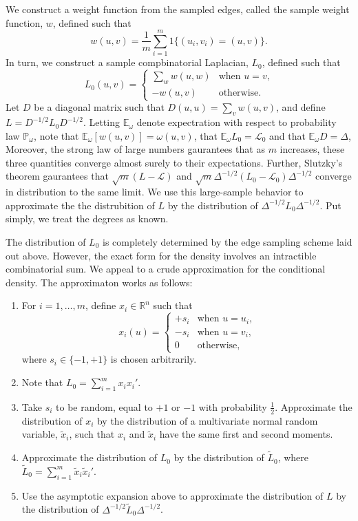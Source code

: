 \documentclass[12pt]{article}
\newcommand{\reals}{\mathbb{R}}
\newcommand{\prob}{\mathbb{P}}
\newcommand{\E}{\mathbb{E}}
\theoremstyle{plain}
\begin{document}
We construct a weight function from the sampled edges, called the
sample weight function, $w$, defined such that
\[
  w(u,v) = \frac{1}{m} \sum_{i=1}^{m} 1\{ (u_i, v_i) = (u,v) \}.
\]
In turn, we construct a sample compbinatorial Laplacian, $L_0$,
defined such that
\[
  L_0(u,v)
    =
    \begin{cases}
      \sum_{w} w(u,w) &\text{when $u = v$,} \\
      -w(u,v) &\text{otherwise.}
    \end{cases}
\]
Let $D$ be a diagonal matrix such that
$D(u,u) = \sum_{v} w(u,v)$, and define $L = D^{-1/2} L_0 D^{-1/2}$.
Letting $\E_\omega$ denote expectration with respect to probability
law $\prob_\omega$, note that $\E_\omega[w(u,v)] = \omega(u,v)$,
that $\E_\omega L_0 = \mathcal{L}_0$ and that $\E_\omega D = \Delta$,
Moreover, the strong law of large numbers gaurantees that as $m$ increases,
these three quantities converge almost surely to their expectations.
Further, Slutzky's theorem gaurantees that $\sqrt{m} (L - \mathcal{L})$ and
$\sqrt{m} \Delta^{-1/2} (L_0 - \mathcal{L}_0) \Delta^{-1/2}$ converge in
distribution to the same limit.  We use this large-sample behavior to
approximate the the distrubition of $L$ by the distribution of
$\Delta^{-1/2} L_0 \Delta^{-1/2}$.  Put simply, we treat the degrees as known.

The distribution of $L_0$ is completely determined by the edge
sampling scheme laid out above.  However, the exact form for the
density involves an intractible combinatorial sum.  We appeal to a
crude approximation for the conditional density.
The approximaton works as follows:
\begin{enumerate}
\item For $i = 1, \dotsc, m$, define $x_i \in \reals^n$ such that
  \[
    x_i(u)
      =
      \begin{cases}
        +s_i &\text{when $u = u_i$,} \\
        -s_i &\text{when $u = v_i$,} \\
        0 &\text{otherwise,}
      \end{cases}
  \]
  where $s_i \in \{ -1, +1 \}$ is chosen arbitrarily.
\item Note that $L_0 = \sum_{i=1}^m x_i x_i'$.
\item Take $s_i$ to be random, equal to $+1$ or $-1$ with probability
  $\tfrac{1}{2}$.  Approximate the distribution of $x_i$ by the
  distribution of a multivariate normal random variable, $\tilde x_i$,
  such that $x_i$ and $\tilde x_i$ have the same first and second
  moments.
\item Approximate the distribution of $L_0$ by the distribution of $\tilde L_0$, where
  \(
  \tilde L_0 = \sum_{i=1}^m \tilde x_i \tilde x_i'.
  \)
  \item Use the asymptotic expansion above to approximate the
    distribution of $L$ by the distribution of
    $\Delta^{-1/2} \tilde L_0 \Delta^{-1/2}$.
\end{enumerate}
\end{document}

